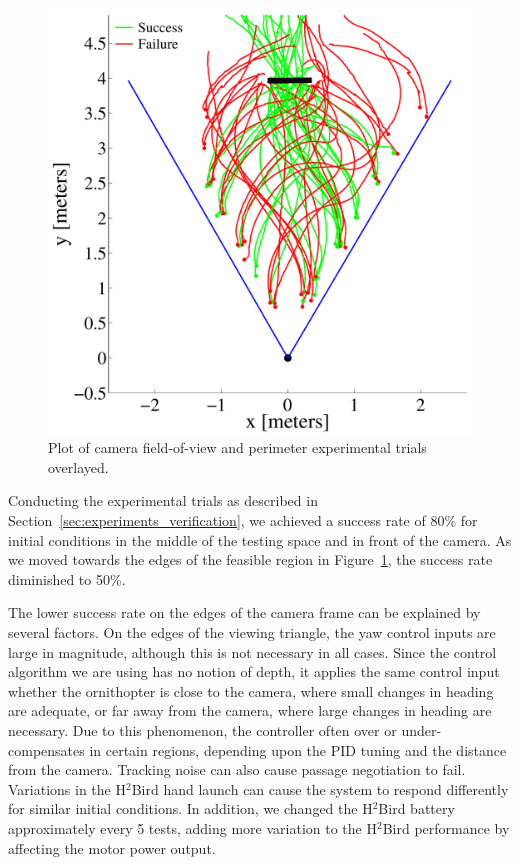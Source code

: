 \documentclass{aamas2013}
\begin{document}
\begin{figure}[tb]
\begin{minipage}[b]{0.45\linewidth}
\includegraphics[width=\textwidth]{figures/flight_paths.pdf}
\caption{Plot of camera field-of-view and perimeter experimental trials overlayed.}
\label{fig:flight_paths}
\end{minipage}
\end{figure}

Conducting the experimental trials as described in 
Section~\ref{sec:experiments_verification}, we achieved a success rate of 
80\% for initial conditions in the middle of the testing space and in front 
of the camera. As we moved towards the edges of the feasible region in 
Figure~\ref{fig:flight_paths}, the success rate diminished to 50\%.

The lower success rate on the edges of the camera frame can be explained by 
several factors. On the edges of the viewing triangle, the yaw control 
inputs are large in magnitude, although this is not necessary in all cases. 
Since the control algorithm we are using has no notion of depth, it applies 
the same control input whether the ornithopter is close to the camera, where 
small changes in heading are adequate, or far away from the camera, where 
large changes in heading are necessary. Due to this phenomenon, the 
controller often over or under-compensates in certain regions, depending 
upon the PID tuning and the distance from the camera. Tracking noise can 
also cause passage negotiation to fail. Variations in the H$^2$Bird hand 
launch can cause the system to respond differently for similar initial 
conditions. In addition, we changed the H$^2$Bird battery approximately every 5 
tests, adding more variation to the H$^2$Bird performance by affecting the 
motor power output.
\end{document}
